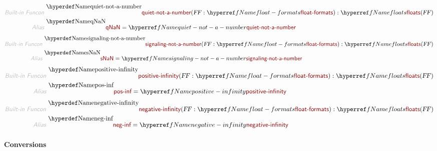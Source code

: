 \begin{align*}
  \KEY{Built-in Funcon} ~ 
  & \NAMEDECL{quiet-not-a-number}(\VAR{FF} : \NAMEREF{float-formats}) : \NAMEREF{floats}
                                                            ( \VAR{FF} )
\\
  \KEY{Alias} ~ 
  & \NAMEDECL{qNaN} = \NAMEREF{quiet-not-a-number}
\end{align*}
\begin{align*}
  \KEY{Built-in Funcon} ~ 
  & \NAMEDECL{signaling-not-a-number}(\VAR{FF} : \NAMEREF{float-formats}) : \NAMEREF{floats}
                                                            ( \VAR{FF} )
\\
  \KEY{Alias} ~ 
  & \NAMEDECL{sNaN} = \NAMEREF{signaling-not-a-number}
\end{align*}
\begin{align*}
  \KEY{Built-in Funcon} ~ 
  & \NAMEDECL{positive-infinity}(\VAR{FF} : \NAMEREF{float-formats}) : \NAMEREF{floats}
                                                            ( \VAR{FF} )
\\
  \KEY{Alias} ~ 
  & \NAMEDECL{pos-inf} = \NAMEREF{positive-infinity}
\end{align*}
\begin{align*}
  \KEY{Built-in Funcon} ~ 
  & \NAMEDECL{negative-infinity}(\VAR{FF} : \NAMEREF{float-formats}) : \NAMEREF{floats}
                                                            ( \VAR{FF} )
\\
  \KEY{Alias} ~ 
  & \NAMEDECL{neg-inf} = \NAMEREF{negative-infinity}
\end{align*}
\paragraph*{Conversions}\hypertarget{conversions}{}\label{conversions}

